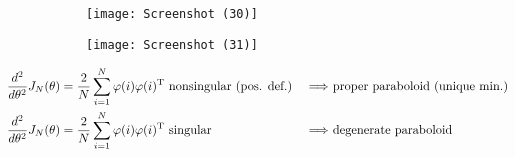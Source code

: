 \begin{figure}
\centering
\begin{subfigure}{.5\textwidth}
  \centering
  \texttt{[image: Screenshot (30)]}
  \label{fig:test1}
\end{subfigure}%
\begin{subfigure}{.5\textwidth}
  \centering
  \texttt{[image: Screenshot (31)]}
  \label{fig:test2}
\end{subfigure}
\end{figure}


\begin{equation*}
\begin{aligned}
\frac{d^{2}}{d\theta ^{2}} J_{N}(\theta) & =\frac{2}{N}\sum _{i=1}^{N} \varphi (i) \varphi (i)\transpose \ \text{nonsingular} \ \text{(pos. def.)} & \Longrightarrow \ & \text{proper paraboloid (unique min.)}\\
\frac{d^{2}}{d\theta ^{2}} J_{N}(\theta) & =\frac{2}{N}\sum _{i=1}^{N} \varphi (i) \varphi (i)\transpose\text{ singular} & \ \Longrightarrow \ & \text{degenerate paraboloid}
\end{aligned}
\end{equation*}

